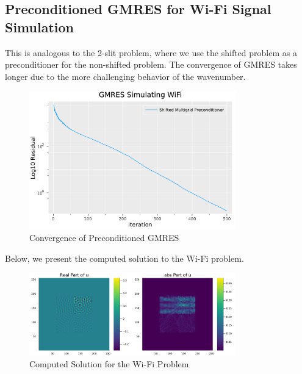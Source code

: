 \documentclass[a4paper,12pt]{article}
\begin{document}
\subsection{Preconditioned GMRES for Wi-Fi Signal Simulation}

This is analogous to the 2-slit problem, where we use the shifted problem as a
preconditioner for the non-shifted problem. The convergence of GMRES takes
longer due to the more challenging behavior of the wavenumber.

\begin{figure}[h!]
    \centering
    \includegraphics[width=0.8\textwidth]{../plots/gmres_wifi.pdf}
    \caption{Convergence of Preconditioned GMRES }
    \label{fig:../plots/gmres_wifi.pdf}
\end{figure}

Below, we present the computed solution to the Wi-Fi problem.

\begin{figure}[h!]
    \centering
    \includegraphics[width=0.8\textwidth]{../plots/gmres_wifi_solution.pdf}
    \caption{Computed Solution for the Wi-Fi Problem}
    \label{fig:gmres_wifi_solution}
\end{figure}
\end{document}
